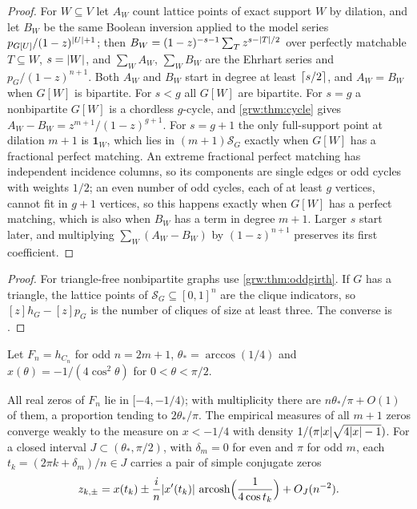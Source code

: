 \begin{proof}
For $W\subseteq V$ let $A_W$ count lattice points of exact support $W$ by
dilation, and let $B_W$ be the same Boolean inversion applied to the model
series $p_{G[U]}/(1-z)^{\lvert U\rvert+1}$; then
$B_W=(1-z)^{-s-1}\sum_Tz^{s-\lvert T\rvert/2}$ over perfectly matchable $T\subseteq W$,
$s=\lvert W\rvert$, and $\sum_WA_W$, $\sum_WB_W$ are the Ehrhart series and
$p_G/(1-z)^{n+1}$. Both $A_W$ and $B_W$ start in degree at least $\lceil s/2\rceil$,
and $A_W=B_W$ when $G[W]$ is bipartite. For $s<g$ all $G[W]$ are bipartite. For
$s=g$ a nonbipartite $G[W]$ is a chordless $g$-cycle, and
\cref{grw:thm:cycle} gives $A_W-B_W=z^{m+1}/(1-z)^{g+1}$. For $s=g+1$ the only
full-support point at dilation $m+1$ is $\mathbf 1_W$, which lies in
$(m+1)\mathcal S_G$ exactly when $G[W]$ has a fractional perfect matching. An
extreme fractional perfect matching has independent incidence columns, so its
components are single edges or odd cycles with weights $1/2$; an even number
of odd cycles, each of at least $g$ vertices, cannot fit in $g+1$ vertices, so
this happens exactly when $G[W]$ has a perfect matching, which is also when
$B_W$ has a term in degree $m+1$. Larger $s$ start later, and multiplying
$\sum_W(A_W-B_W)$ by $(1-z)^{n+1}$ preserves its first coefficient.
\end{proof}


\begin{proof}
For triangle-free nonbipartite graphs use \cref{grw:thm:oddgirth}. If $G$
has a triangle, the lattice points of $\mathcal S_G\subseteq[0,1]^n$ are the
clique indicators, so $[z]h_G-[z]p_G$ is the number of cliques of size at
least three. The converse is \cite[Lemma~3.11]{DavisKohl2024Perfectly}.
\end{proof}

Let $F_n=h_{C_n}$ for odd $n=2m+1$, $\theta_*=\arccos(1/4)$ and
$x(\theta)=-1/(4\cos^2\theta)$ for $0<\theta<\pi/2$.

\begin{theorem}\label{grw:thm:cyclezeros}
All real zeros of $F_n$ lie in $[-4,-1/4)$; with multiplicity there are
$n\theta_*/\pi+O(1)$ of them, a proportion tending to $2\theta_*/\pi$. The
empirical measures of all $m+1$ zeros converge weakly to the measure on
$x<-1/4$ with density $1/(\pi\lvert x\rvert\sqrt{4\lvert x\rvert-1})$. For a closed interval
$J\subset(\theta_*,\pi/2)$, with $\delta_m=0$ for even and $\pi$ for odd $m$,
each $t_k=(2\pi k+\delta_m)/n\in J$ carries a pair of simple conjugate zeros
\[
 z_{k,\pm}=x(t_k)\pm\frac in\lvert x'(t_k)\rvert\,\operatorname{arcosh}\Bigl(\frac1{4\cos t_k}\Bigr)+O_J(n^{-2}).
\]
\end{theorem}

